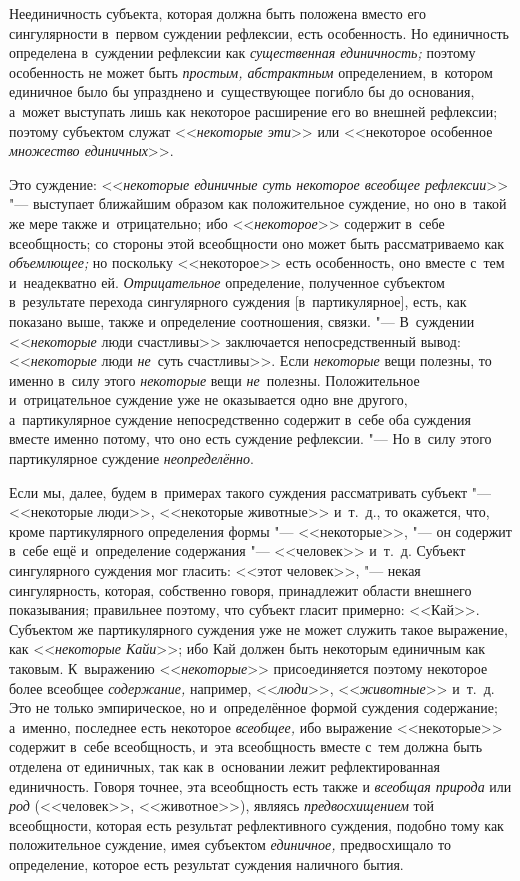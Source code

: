 
Неединичность субъекта, которая должна быть положена вместо его сингулярности
в~первом суждении рефлексии, есть особенность. Но единичность определена
в~суждении рефлексии как {\em существенная единичность;} поэтому особенность не
может быть {\em простым, абстрактным} определением, в~котором единичное
было бы упразднено и~существующее погибло бы до основания, а~может выступать
лишь как некоторое расширение его во внешней рефлексии; поэтому субъектом
служат <<{\em некоторые эти}>> или <<некоторое особенное
{\em множество единичных}>>.

Это суждение: <<{\em некоторые единичные суть некоторое всеобщее рефлексии}>>
"--- выступает ближайшим образом как положительное суждение, но оно в~такой же
мере также и~отрицательно; ибо <<{\em некоторое}>> содержит в~себе всеобщность;
со стороны этой всеобщности оно может быть рассматриваемо как {\em объемлющее;}
но поскольку <<некоторое>> есть особенность, оно вместе с~тем и~неадекватно ей.
{\em Отрицательное} определение, полученное субъектом в~результате перехода
сингулярного суждения [в~партикулярное], есть, как показано выше, также и
определение соотношения, связки. "--- В~суждении <<{\em некоторые} люди
счастливы>> заключается непосредственный вывод: <<{\em некоторые} люди
{\em не}~суть счастливы>>. Если {\em некоторые} вещи полезны, то именно в~силу
этого {\em некоторые} вещи {\em не}~полезны. Положительное и~отрицательное
суждение уже не оказывается одно вне другого, а~партикулярное суждение
непосредственно содержит в~себе оба суждения вместе именно потому, что
оно есть суждение рефлексии. "--- Но в~силу этого партикулярное суждение
{\em неопределённо}.

Если мы, далее, будем в~примерах такого суждения рассматривать субъект "---
<<некоторые люди>>, <<некоторые животные>> и~т.~д., то окажется, что, кроме
партикулярного определения формы "--- <<некоторые>>, "--- он содержит в~себе
ещё и~определение содержания "--- <<человек>> и~т.~д. Субъект сингулярного
суждения мог гласить: <<этот человек>>, "--- некая сингулярность, которая,
собственно говоря, принадлежит области внешнего показывания; правильнее
поэтому, что субъект гласит примерно: <<Кай>>. Субъектом же партикулярного
суждения уже не может служить такое выражение, как <<{\em некоторые Кайи}>>;
ибо Кай должен быть некоторым единичным как таковым. К~выражению
<<{\em некоторые}>> присоединяется поэтому некоторое более всеобщее
{\em содержание,} например, <<{\em люди}>>, <<{\em животные}>> и~т.~д. Это
не только эмпирическое, но и~определённое формой суждения содержание; а~именно,
последнее есть некоторое {\em всеобщее,} ибо выражение <<некоторые>> содержит
в~себе всеобщность, и~эта всеобщность вместе с~тем должна быть отделена от
единичных, так как в~основании лежит рефлектированная единичность. Говоря
точнее, эта всеобщность есть также и {\em всеобщая природа} или {\em род}
(<<человек>>, <<животное>>), являясь {\em предвосхищением} той всеобщности,
которая есть результат рефлективного суждения, подобно тому как положительное
суждение, имея субъектом {\em единичное,} предвосхищало то определение, которое
есть результат суждения наличного бытия.

